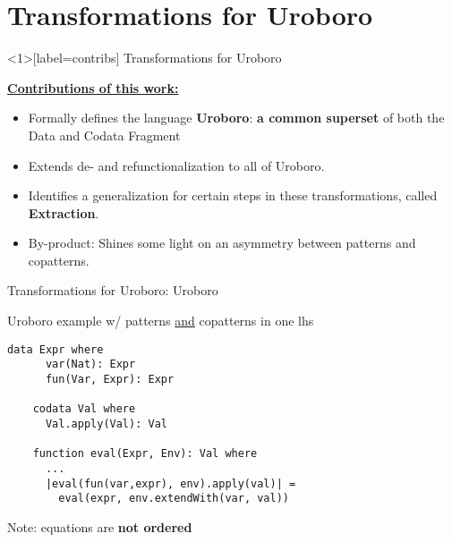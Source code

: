 \documentclass[xcolor=svgnames]{beamer}
\begin{document}
\section
  {Transformations for Uroboro}


\begin{frame}<1>[label=contribs]
  {Transformations for Uroboro}

  \underline{\textbf{Contributions of this work:}}

  \begin{itemize}
  \item \alert<2>{Formally defines the language \textbf{Uroboro}: \textbf{a common superset} of both the Data and Codata Fragment}

  \item \alert<3>{Extends de- and refunctionalization to all of Uroboro.}

  \item \alert<4>{Identifies a generalization for certain steps in these transformations, called \textbf{Extraction}.}

  \item \alert<5>{By-product: Shines some light on an asymmetry between patterns and copatterns.}
   \end{itemize}
\end{frame}


\begin{frame}[fragile]
  {Transformations for Uroboro: Uroboro}

  \begin{block}{Uroboro example w/ patterns \underline{and} copatterns in one lhs}
    \begin{lstlisting}[style=base, gobble=4]
    data Expr where
      var(Nat): Expr
      fun(Var, Expr): Expr

    codata Val where
      Val.apply(Val): Val

    function eval(Expr, Env): Val where
      ...
      |eval(fun(var,expr), env).apply(val)| = 
        eval(expr, env.extendWith(var, val))
    \end{lstlisting}
  \end{block}

  Note: equations are \textbf{not ordered}
\end{frame}
\end{document}
